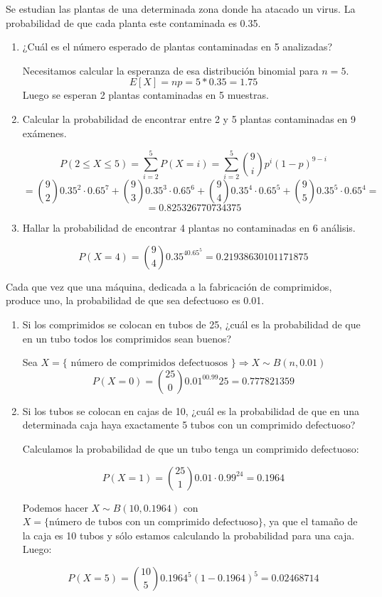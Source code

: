 \begin{ejer}
Se estudian las plantas de una determinada zona donde ha atacado un virus. La probabilidad de que cada planta este contaminada es 0.35.
\end{ejer}

\begin{sol}

\begin{enumerate}
\item ¿Cuál es el número esperado de plantas contaminadas en 5 analizadas?

Necesitamos calcular la esperanza de esa distribución binomial para $n=5$.
\[
E[X]=np=5*0.35=1.75
\]
Luego se esperan 2 plantas contaminadas en 5 muestras.

\item Calcular la probabilidad de encontrar entre 2 y 5 plantas contaminadas en 9 exámenes.

\[
P(2 \leq X \leq 5) = \sum_{i=2}^5P(X=i) = \sum_{i=2}^5\binom{9}{i}p^i(1-p)^{9-i}
\]
\[
= \binom{9}{2}0.35^2\cdot 0.65^7+\binom{9}{3}0.35^3\cdot 0.65^6+\binom{9}{4}0.35^4\cdot 0.65^5+\binom{9}{5}0.35^5\cdot 0.65^4= 
\]
\[
= 0.825326770734375
\]

\item Hallar la probabilidad de encontrar 4 plantas no contaminadas en 6 análisis.

\[
P(X=4)=\binom{9}{4}0.35^40.65^5=0.21938630101171875
\]
\end{enumerate}

\end{sol}


\begin{ejer}
Cada que vez que una máquina, dedicada a la fabricación de comprimidos, produce uno, la probabilidad de que sea defectuoso es 0.01.
\end{ejer}

\begin{sol}
\begin{enumerate}
\item Si los comprimidos se colocan en tubos de 25, ¿cuál es la probabilidad de que en un tubo todos los comprimidos sean buenos?

Sea $X = \{\text{ número de comprimidos defectuosos } \} \Longrightarrow X \sim B(n,0.01)$
\[
P(X=0)=\binom{25}{0}0.01^00.99{25} = 0.777821359
\]

\item Si los tubos se colocan en cajas de 10, ¿cuál es la probabilidad de que en una determinada caja haya exactamente 5 tubos con un comprimido defectuoso?

Calculamos la probabilidad de que un tubo tenga un comprimido defectuoso:

\[
P(X=1)=\binom{25}{1}0.01\cdot 0.99^{24} =0.1964
\]

Podemos hacer $X \sim B(10, 0.1964)$ con $X = \{\text{número de tubos con un comprimido defectuoso}\} $, ya que el tamaño de la caja es 10 tubos y sólo estamos calculando la probabilidad para una caja. Luego:

\[
P(X=5)=\binom{10}{5}0.1964^5(1-0.1964)^5=0.02468714
\]
\end{enumerate}
\end{sol}

